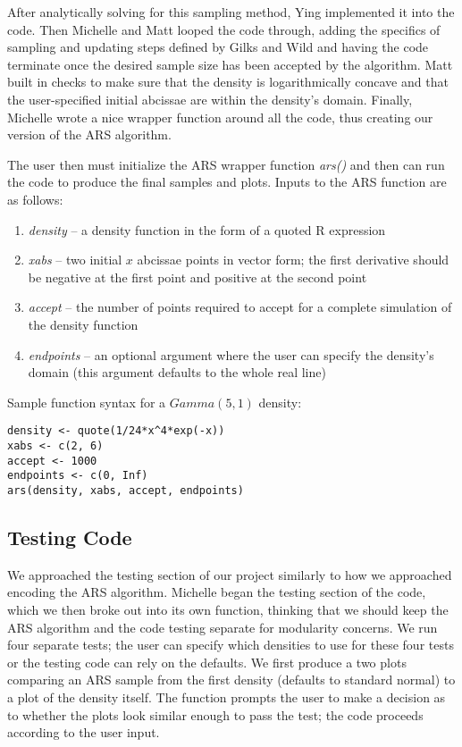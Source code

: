 \documentclass{article}
\begin{document}
After analytically solving for this sampling method, Ying implemented it into the code.  Then Michelle and Matt looped the code through, adding the specifics of sampling and updating steps defined by Gilks and Wild and having the code terminate once the desired sample size has been accepted by the algorithm.  Matt built in checks to make sure that the density is logarithmically concave and that the user-specified initial abcissae are within the density's domain.  Finally, Michelle wrote a nice wrapper function around all the code, thus creating our version of the ARS algorithm.

The user then must initialize the ARS wrapper function \textit{ars()} and then can run the code to produce the final samples and plots. Inputs to the ARS function are as follows:
\begin{enumerate}
\item \textit{density} -- a density function in the form of a quoted R expression
\item \textit{xabs} -- two initial $x$ abcissae points in vector form; the first derivative should be negative at the first point and positive at the second point
\item \textit{accept} -- the number of points required to accept for a complete simulation of the density function
\item \textit{endpoints} -- an optional argument where the user can specify the density's domain (this argument defaults to the whole real line)
\end{enumerate}
Sample function syntax for a $Gamma\left(5,1\right)$ density:

\begin{lstlisting}
density <- quote(1/24*x^4*exp(-x))
xabs <- c(2, 6)
accept <- 1000
endpoints <- c(0, Inf)
ars(density, xabs, accept, endpoints)
\end{lstlisting}


\subsection{Testing Code}
We approached the testing section of our project similarly to how we approached encoding the ARS algorithm.  Michelle began the testing section of the code, which we then broke out into its own function, thinking that we should keep the ARS algorithm and the code testing separate for modularity concerns.  We run four separate tests; the user can specify which densities to use for these four tests or the testing code can rely on the defaults.  We first produce a two plots comparing an ARS sample from the first density (defaults to standard normal) to a plot of the density itself.  The function prompts the user to make a decision as to whether the plots look similar enough to pass the test; the code proceeds according to the user input.
\end{document}
